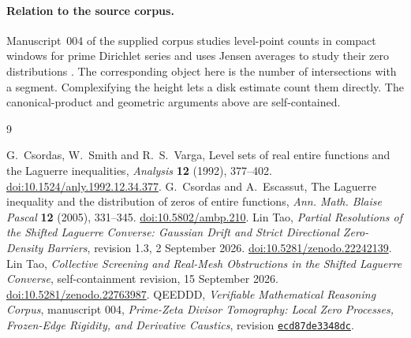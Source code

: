 \documentclass[11pt,a4paper]{article}
\numberwithin{equation}{section}
\begin{document}
\paragraph{Relation to the source corpus.}
Manuscript~004 of the supplied corpus studies level-point counts in
compact windows for prime Dirichlet series and uses Jensen averages to
study their zero distributions \cite{corpus}. The corresponding object
here is the number of intersections with a segment. Complexifying the
height lets a disk estimate count them directly. The canonical-product
and geometric arguments above are self-contained.

\begin{thebibliography}{9}\raggedright
{} G.~Csordas, W.~Smith and R.~S.~Varga,
Level sets of real entire functions and the Laguerre inequalities,
\emph{Analysis} \textbf{12} (1992), 377--402.
\href{https://doi.org/10.1524/anly.1992.12.34.377}{doi:10.1524/anly.1992.12.34.377}.
 G.~Csordas and A.~Escassut,
The Laguerre inequality and the distribution of zeros of entire functions,
\emph{Ann. Math. Blaise Pascal} \textbf{12} (2005), 331--345.
\href{https://doi.org/10.5802/ambp.210}{doi:10.5802/ambp.210}.
 Lin Tao,
\emph{Partial Resolutions of the Shifted Laguerre Converse: Gaussian Drift and
Strict Directional Zero-Density Barriers}, revision 1.3, 2 September 2026.
\href{https://doi.org/10.5281/zenodo.22242139}{doi:10.5281/zenodo.22242139}.
 Lin Tao,
\emph{Collective Screening and Real-Mesh Obstructions in the Shifted Laguerre
Converse}, self-containment revision, 15 September 2026.
\href{https://doi.org/10.5281/zenodo.22763987}{doi:10.5281/zenodo.22763987}.
 QEEDDD, \emph{Verifiable Mathematical Reasoning Corpus},
manuscript 004, \emph{Prime-Zeta Divisor Tomography: Local Zero Processes,
Frozen-Edge Rigidity, and Derivative Caustics}, revision
\href{https://github.com/QEEDDD/Verifiable-Mathematical-Reasoning-Corpus/tree/ecd87de3348dcb706a76bb12fde722d7a348a012}{\texttt{ecd87de3348dc}}.
\end{thebibliography}
\end{document}
